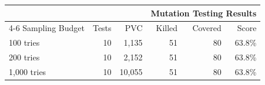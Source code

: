   \begin{tabular*}{\linewidth}{@{\hspace{\tabcolsep}\extracolsep{\fill}}lrrrrr}
  \toprule
  \VariantImproved{} &  &  & \multicolumn{3}{r}{Mutation Testing Results} \\
  \cmidrule(lr){4-6}
  Sampling Budget & Tests & PVC & Killed & Covered & Score \\
  \midrule
  100 tries & 10 & 1,135 & 51 & 80 & 63.8\% \\
  200 tries & 10 & 2,152 & 51 & 80 & 63.8\% \\
  1,000 tries & 10 & 10,055 & 51 & 80 & 63.8\% \\
  \bottomrule
  \end{tabular*}
